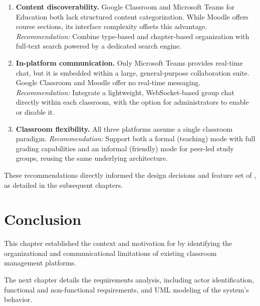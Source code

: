 \begin{enumerate}[label=(\roman*)]
  \item \textbf{Content discoverability.}
        Google Classroom and Microsoft Teams for Education both lack structured content categorization.
        While Moodle offers course sections, its interface complexity offsets this advantage.
        \emph{Recommendation:} Combine type-based and chapter-based organization with full-text search powered by a dedicated search engine.

  \item \textbf{In-platform communication.}
        Only Microsoft Teams provides real-time chat, but it is embedded within a large, general-purpose collaboration suite.
        Google Classroom and Moodle offer no real-time messaging.
        \emph{Recommendation:} Integrate a lightweight, WebSocket-based group chat directly within each classroom, with the option for administrators to enable or disable it.

  \item \textbf{Classroom flexibility.}
        All three platforms assume a single classroom paradigm.
        \emph{Recommendation:} Support both a formal (teaching) mode with full grading capabilities and an informal (friendly) mode for peer-led study groups, reusing the same underlying architecture.
  \end{enumerate}

These recommendations directly informed the design decisions and feature set of \eduspace{}, as detailed in the subsequent chapters.

\section*{Conclusion}

This chapter established the context and motivation for \eduspace{} by identifying the organizational and communicational limitations of existing classroom management platforms.


The next chapter details the requirements analysis, including actor identification, functional and non-functional requirements, and UML modeling of the system's behavior.
